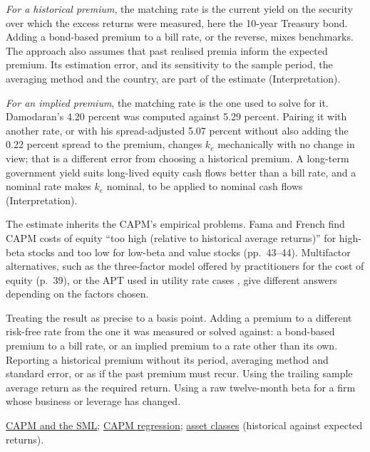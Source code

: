 \begin{qfmethod}
\emph{For a historical premium}, the matching rate is the current yield on the security over which the excess returns were measured, here the 10-year Treasury bond. Adding a bond-based premium to a bill rate, or the reverse, mixes benchmarks. The approach also assumes that past realised premia inform the expected premium. Its estimation error, and its sensitivity to the sample period, the averaging method and the country, are part of the estimate (Interpretation).

\emph{For an implied premium}, the matching rate is the one used to solve for it. Damodaran's 4.20 percent was computed against 5.29 percent. Pairing it with another rate, or with his spread-adjusted 5.07 percent without also adding the 0.22 percent spread to the premium, changes $k_e$ mechanically with no change in view; that is a different error from choosing a historical premium. A long-term government yield suits long-lived equity cash flows better than a bill rate, and a nominal rate makes $k_e$ nominal, to be applied to nominal cash flows (Interpretation).

The estimate inherits the CAPM's empirical problems. Fama and French find CAPM costs of equity ``too high (relative to historical average returns)'' for high-beta stocks and too low for low-beta and value stocks (pp.~43--44). Multifactor alternatives, such as the three-factor model offered by practitioners for the cost of equity (p.~39), or the APT used in utility rate cases \citep[FRBNY Staff Report 216, August 2005, sec.~9]{arbitrage-pricing-review-2005}, give different answers depending on the factors chosen.

 Treating the result as precise to a basis point. Adding a premium to a different risk-free rate from the one it was measured or solved against: a bond-based premium to a bill rate, or an implied premium to a rate other than its own. Reporting a historical premium without its period, averaging method and standard error, or as if the past premium must recur. Using the trailing sample average return as the required return. Using a raw twelve-month beta for a firm whose business or leverage has changed.

 \hyperref[mod:capm-sml]{CAPM and the SML}; \hyperref[meth:capm-regression]{CAPM regression}; \hyperref[def:asset-class-characteristics]{asset classes} (historical against expected returns).

\end{qfmethod}

